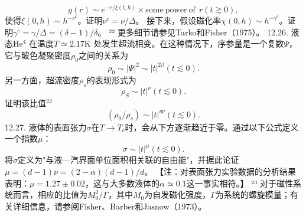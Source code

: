 \begin{equation}\tag{12.13.49}\label{eq:12.13.49}
g ( r ) \sim e ^{- r / \xi ( t , h )} \times \mathrm { s o m e \ p o w e r \ o f \ } \ r  ( t \gtrsim 0 ) ,
\end{equation}
使得\(\xi(0,h)\sim h^{-\nu^{c}}\)。证明\(\nu^{c}=\nu/\Delta\)。
接下来，假设磁化率\(\chi(0,h)\sim h^{-\gamma^{c}}\)。证明\(\gamma^{c}=\gamma/\Delta=(\delta-1)/\delta\)。
²² 更多细节请参见Tarko和Fisher（1975）。
12.26. 液态He\(^{4}\) 在温度\(T \simeq 2.17\)K 处发生超流相变。在这种情况下，序参量是一个复数\(\Psi\)，它与玻色凝聚密度\(\rho_{0}\)之间的关系为
\begin{equation}\tag{12.13.50}\label{eq:12.13.50}
\rho _ { 0 } \sim | \Psi | ^{2} \sim | t | ^{2 \beta}  ( t \lesssim 0 ) .
\end{equation}
另一方面，超流密度\(\rho_{s}\)的表现形式为
\begin{equation}\tag{12.13.51}\label{eq:12.13.51}
\rho _ { S } \sim | t | ^{\nu}  ( t \lesssim 0 ) .
\end{equation}
证明该比值\(^{23}\)
\begin{equation}\tag{12.13.52}\label{eq:12.13.52}
( \rho _ { 0 } / \rho _ { s } ) \sim | t | ^{\eta \nu}  ( t \lesssim 0 ) .
\end{equation}
12.27. 液体的表面张力\(\sigma\)在\(T \rightarrow T_{c}\)时，会从下方逐渐趋近于零。通过以下公式定义一个指数\(\mu\)：
\begin{equation}\tag{12.13.53}\label{eq:12.13.53}
\sigma \sim | t | ^{\mu}  ( t \lesssim 0 ) .
\end{equation}
将\(\sigma\)定义为"与液---汽界面单位面积相关联的自由能"，并据此论证\(\mu=(d-1)\nu=(2-\alpha)(d-1)/d\)。
【注：对表面张力实验数据的分析结果表明：\(\mu = 1.27 \pm 0.02\)，这与大多数液体的\(\alpha \simeq 0.1\)这一事实相符。】
²³ 对于磁性系统而言，相应的比值为\(M_{0}^{2}/\Gamma\)，其中\(M_{0}\)为自发磁化强度，\(\Gamma\)为系统的螺旋模量；有关详细信息，请参阅Fisher、Barber和Jasnow（1973）。


